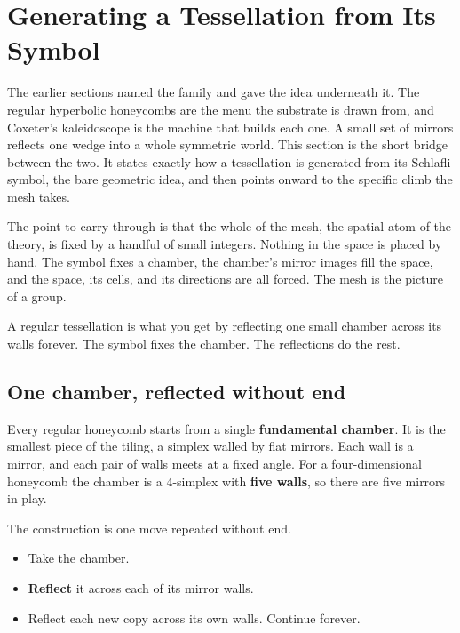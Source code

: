 \section{Generating a Tessellation from Its Symbol}

The earlier sections named the family and gave the idea underneath it. The regular hyperbolic honeycombs are the menu the substrate is drawn from, and Coxeter's kaleidoscope is the machine that builds each one. A small set of mirrors reflects one wedge into a whole symmetric world. This section is the short bridge between the two. It states exactly how a tessellation is generated from its Schlafli symbol, the bare geometric idea, and then points onward to the specific climb the mesh takes.

The point to carry through is that the whole of the mesh, the spatial atom of the theory, is fixed by a handful of small integers. Nothing in the space is placed by hand. The symbol fixes a chamber, the chamber's mirror images fill the space, and the space, its cells, and its directions are all forced. The mesh is the picture of a group.

\begin{principle}
A regular tessellation is what you get by reflecting one small chamber across its walls forever. The symbol fixes the chamber. The reflections do the rest.
\end{principle}

\subsection{One chamber, reflected without end}

Every regular honeycomb starts from a single \textbf{fundamental chamber}. It is the smallest piece of the tiling, a simplex walled by flat mirrors. Each wall is a mirror, and each pair of walls meets at a fixed angle. For a four-dimensional honeycomb the chamber is a $4$-simplex with \textbf{five walls}, so there are five mirrors in play.

The construction is one move repeated without end.

\begin{itemize}
\item Take the chamber.
\item \textbf{Reflect} it across each of its mirror walls.
\item Reflect each new copy across its own walls. Continue forever.
\end{itemize}

